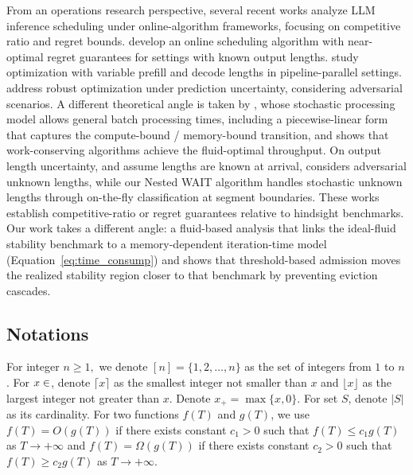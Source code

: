 From an operations research perspective, several recent works analyze LLM inference scheduling under online-algorithm frameworks, focusing on competitive ratio and regret bounds. \cite{jaillet2025onlineschedulingllminference} develop an online scheduling algorithm with near-optimal regret guarantees for settings with known output lengths. \cite{wang2025llm} study optimization with variable prefill and decode lengths in pipeline-parallel settings. \cite{chen2025adaptively} address robust optimization under prediction uncertainty, considering adversarial scenarios. A different theoretical angle is taken by \cite{li2025throughput}, whose stochastic processing model allows general batch processing times, including a piecewise-linear form that captures the compute-bound / memory-bound transition, and shows that work-conserving algorithms achieve the fluid-optimal throughput. On output length uncertainty, \cite{jaillet2025onlineschedulingllminference} and \cite{wang2025llm} assume lengths are known at arrival, \cite{chen2025adaptively} considers adversarial unknown lengths, while our Nested WAIT algorithm handles stochastic unknown lengths through on-the-fly classification at segment boundaries. These works establish competitive-ratio or regret guarantees relative to hindsight benchmarks. Our work takes a different angle: a fluid-based analysis that links the ideal-fluid stability benchmark to a memory-dependent iteration-time model (Equation~\eqref{eq:time_consump}) and shows that threshold-based admission moves the realized stability region closer to that benchmark by preventing eviction cascades.


\subsection{Notations}
For integer $n\ge 1,$ we denote $[n]=\{1,2,\dots,n\}$ as the set of integers from $1$ to $n$. For $x\in\real$, denote $\lceil x\rceil$ as the smallest integer not smaller than $x$ and $\lfloor x\rfloor$ as the largest integer not greater than $x$. Denote $x_+=\max\{x, 0\}$. For set $S$, denote $|S|$ as its cardinality. For two functions $f(T)$ and $g(T)$, we use $f(T)=O(g(T))$ if there exists constant $c_1>0$ such that $f(T)\le c_1g(T)$ as $T\to+\infty$ and $f(T)=\Omega(g(T))$ if there exists constant $c_2>0$ such that $f(T)\ge c_2g(T)$ as $T\to +\infty$. 
